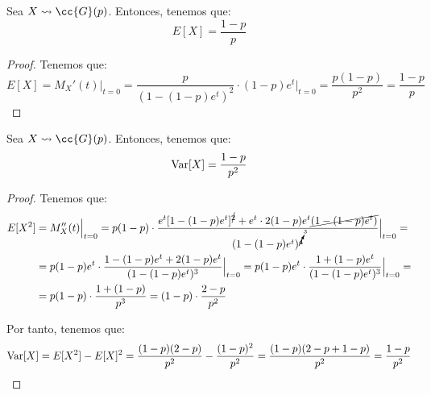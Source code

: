 \begin{coro}
    Sea $X\leadsto \cc{G}(p)$. Entonces, tenemos que:
    \begin{equation*}
        E[X] = \frac{1-p}{p}
    \end{equation*}
\end{coro}
\begin{proof}
    Tenemos que:
    \begin{equation*}
        E[X] = M_X'(t)\Big|_{t=0} = \frac{p}{(1-(1-p)e^t)^2}\cdot (1-p)e^t\Big|_{t=0} = \frac{p(1-p)}{p^2} = \frac{1-p}{p}
    \end{equation*}
\end{proof}

\begin{coro}
    Sea $X\leadsto \cc{G}(p)$. Entonces, tenemos que:
    \begin{equation*}
        \operatorname{Var}[X] = \frac{1-p}{p^2}
    \end{equation*}
\end{coro}
\begin{proof}
    Tenemos que:
    \begin{align*}
        E[X^2] &= M_X''(t)\Big|_{t=0} = p(1-p)\cdot \dfrac{e^t[1-(1-p)e^t]^{\cancel{2}} + e^t\cdot 2(1-p)e^t\cancel{(1-(1-p)e^t)}}{(1-(1-p)e^t)^{\cancelto{3}{4}}}\Big|_{t=0} =\\
        &= p(1-p)e^t\cdot \dfrac{1-(1-p)e^t + 2(1-p)e^t}{(1-(1-p)e^t)^3}\Big|_{t=0}
        = p(1-p)e^t\cdot \dfrac{1+(1-p)e^t}{(1-(1-p)e^t)^3}\Big|_{t=0} =\\
        &= p(1-p)\cdot \dfrac{1+(1-p)}{p^3}
        = (1-p)\cdot \dfrac{2-p}{p^2}
    \end{align*}

    Por tanto, tenemos que:
    \begin{equation*}
        \operatorname{Var}[X] = E[X^2] - E[X]^2
        = \dfrac{(1-p)(2-p)}{p^2} - \dfrac{(1-p)^2}{p^2}
        = \dfrac{(1-p)(2-p+1-p)}{p^2} = \dfrac{1-p}{p^2}
    \end{equation*}
\end{proof}

